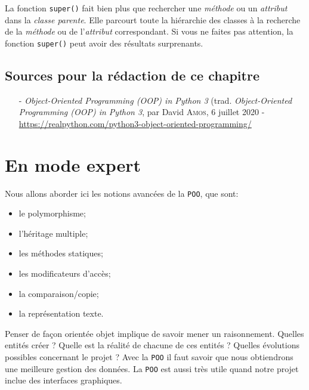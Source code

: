 \documentclass[a4paper,11pt]{book}
\begin{document}
La fonction \texttt{super()} fait bien plus que rechercher une \textit{méthode} ou un \textit{attribut} dans la \textit{classe parente}. Elle parcourt toute la hiérarchie des classes à la recherche de la \textit{méthode} ou de l'\textit{attribut} correspondant. Si vous ne faites pas attention, la fonction \texttt{super()} peut avoir des résultats surprenants.
\medskip

\section*{Sources pour la rédaction de ce chapitre}
\begin{itemize}
	\item[-] \textit{Object-Oriented Programming (OOP) in Python 3} (trad. \textit{Object-Oriented Programming (OOP) in Python 3}, par David \textsc{Amos}, 6 juillet 2020 - \\ \url{https://realpython.com/python3-object-oriented-programming/}
\end{itemize}
\medskip

\chapter{En mode expert}
Nous allons aborder ici les notions avancées de la \texttt{POO}, que sont:
\begin{itemize}
	\item le polymorphisme;
	\item l'héritage multiple;
	\item les méthodes statiques;
	\item les modificateurs d'accès;
	\item la comparaison/copie;
	\item la représentation texte.
\end{itemize}
\medskip

Penser de façon orientée objet implique de savoir mener un raisonnement. Quelles entités créer ? Quelle est la réalité de chacune de ces entités ? Quelles évolutions possibles concernant le projet ? Avec la \texttt{POO} il faut savoir que nous obtiendrons une meilleure gestion des données. La \texttt{POO} est aussi très utile quand notre projet inclue des interfaces graphiques.
\medskip
\end{document}
